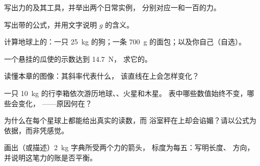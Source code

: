 \begin{exercise}[$\star$]\label{exo:g9:weight-vs-mass:1}
写出力的及其工具，并举出两个日常实例，
分别对应一和一百的力。
\end{exercise}

\begin{exercise}[$\star$]\label{exo:g9:weight-vs-mass:2}
写出带的公式，并用文字说明
$g$ 的含义。
\end{exercise}

\begin{exercise}[$\star$]\label{exo:g9:weight-vs-mass:3}
计算地球上的：一只 \qty{25}{kg} 的狗；一条 \qty{700}{g}
的面包；以及你自己（自选）。
\end{exercise}

\begin{exercise}[$\star$]\label{exo:g9:weight-vs-mass:4}
一个悬挂的瓜使的示数达到 \qty{14.7}{N}，
求它的。
\end{exercise}

\begin{exercise}[$\star$]\label{exo:g9:weight-vs-mass:5}
读懂本章的图像：其斜率代表什么，
该直线在上会怎样变化？
\end{exercise}

\begin{exercise}[$\star$]\label{exo:g9:weight-vs-mass:6}
一只 \qty{10}{kg} 的行李箱依次游历地球、、火星和木星。
表中哪些数值始终不变，哪些会变化，
——原因何在？
\end{exercise}

\begin{exercise}[$\star$]\label{exo:g9:weight-vs-mass:7}
为什么在每个星球上都能给出真实的读数，而
浴室秤在上却会谄媚？请以公式为依据，而非凭感觉。
\end{exercise}

\begin{exercise}[$\star$]\label{exo:g9:weight-vs-mass:8}
画出（或描述）\qty{2}{kg} 字典所受两个力的箭头，
标度为每五：写明长度、
方向，并说明这笔力的账是否平衡。
\end{exercise}

